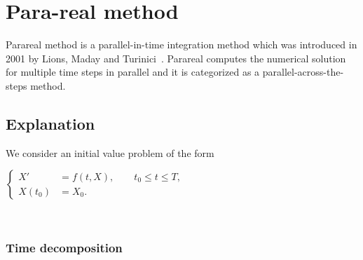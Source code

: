 \section{Para-real method}
	
Parareal method is a parallel-in-time integration method which was introduced in 2001 by Lions, Maday and Turinici~\cite{partie2_ref1}. Parareal computes the numerical solution for multiple time steps in parallel and it is categorized as a parallel-across-the-steps method.

\subsection{Explanation}

We consider an initial value problem of the form \\
\begin{minipage}{\linewidth}
	\centering
	$\left\{\begin{aligned}
		X'&=f(t,X), \qquad t_0\le t\le T, \\
		X(t_0)&=X_0.
	\end{aligned}\right.$ \\
\end{minipage} \\

\subsubsection{Time decomposition}

